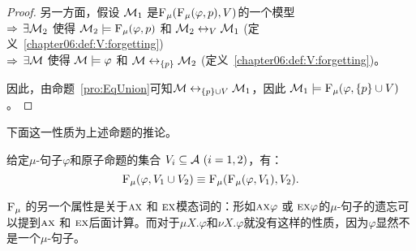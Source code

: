 \begin{proof}
	另一方面，假设 ${\cal M}_1$ 是${\textsc{F}_{\textsc{$\mu$}}}({\textsc{F}_{\textsc{$\mu$}}}(\varphi, p), V)$的一个模型 \\
	$\Rightarrow$ $\exists {\cal M}_2$ 使得 ${\cal M}_2 \models  {\textsc{F}_{\textsc{$\mu$}}}(\varphi, p)$ 和 ${\cal M}_2 \leftrightarrow_V {\cal M}_1$ \hfill(定义~\ref{chapter06:def:V:forgetting})\\
	$\Rightarrow$ $\exists {\cal M}$ 使得 ${\cal M} \models \varphi$ 和 ${\cal M} \leftrightarrow_{\{p\}} {\cal M}_2$ \hfill(定义~\ref{chapter06:def:V:forgetting})。
	
	因此，由命题~\ref{pro:EqUnion}可知${\cal M} \leftrightarrow_{\{p\} \cup V} {\cal M}_1$，因此 ${\cal M}_1 \models {\textsc{F}_{\textsc{$\mu$}}}(\varphi, \{p\} \cup V)$。
\end{proof}


下面这一性质为上述命题的推论。

\begin{corollary}[交换性]\label{chapter06:disTFV}
	给定$\mu$-句子$\varphi$和原子命题的集合 $V_i\subseteq{\cal A}~(i=1,2)$，有：
	\[
	{\textsc{F}_{\textsc{$\mu$}}}(\varphi, V_1 \cup V_2) \equiv {\textsc{F}_{\textsc{$\mu$}}}({\textsc{F}_{\textsc{$\mu$}}}(\varphi, V_1), V_2).
	\]
\end{corollary}

${\textsc{F}_{\textsc{$\mu$}}}$ 的另一个属性是关于$\textsc{a}\textsc{x}$ 和 $\textsc{e} \textsc{x}$模态词的：形如$\textsc{a}\textsc{x} \varphi$ 或 $\textsc{e} \textsc{x} \varphi$的$\mu$-句子的遗忘可以提到$\textsc{a}\textsc{x}$ 和 $\textsc{e} \textsc{x}$后面计算。而对于$\mu X. \varphi$和$\nu X. \varphi$就没有这样的性质，因为$\varphi$显然不是一个$\mu$-句子。


